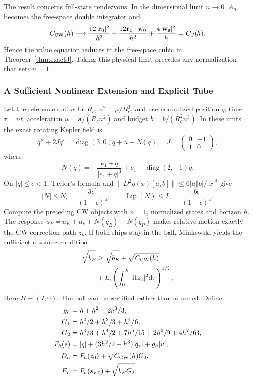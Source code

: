 \documentclass[journal,a4paper]{IEEEtran}
\newcommand{\dd}{\mathrm d}
\begin{document}
The result concerns full-state rendezvous. In the dimensional limit
$n\to0$, $A_n$ becomes the free-space double integrator and
\begin{equation}
 C_{\rm CW}(h)\longrightarrow
 \frac{12|\mathbf r_0|^2}{h^3}
 +\frac{12\mathbf r_0\cdot\mathbf w_0}{h^2}
 +\frac{4|\mathbf w_0|^2}{h}=C_J(h).
\end{equation}
Hence the value equation reduces to the free-space cubic in
Theorem~\ref{thm:exactJ}. Taking this physical limit precedes any
normalization that sets $n=1$.

\subsubsection{A Sufficient Nonlinear Extension and Explicit Tube}
Let the reference radius be $R_c$, $n^2=\mu/R_c^3$, and use normalized
position $q$, time $\tau=nt$, acceleration $u=\mathbf a/(R_cn^2)$ and
budget $\bar b=b/(R_c^2n^3)$. In these units the exact rotating Kepler
field is
\begin{equation}
 q''+2Jq'=\operatorname{diag}(3,0)q+u+N(q),
 \quad J=\begin{pmatrix}0&-1\\1&0\end{pmatrix},
\end{equation}
where
\begin{equation}
 N(q)=-\frac{e_1+q}{|e_1+q|^3}+e_1-\operatorname{diag}(2,-1)q.
\end{equation}
On $|q|\le\epsilon<1$, Taylor's formula and
$\|D^2g(x)[a,b]\|\le6|a||b|/|x|^4$ give
\begin{equation}
 |N|\le N_\epsilon=\frac{3\epsilon^2}{(1-\epsilon)^4},\qquad
 \operatorname{Lip}(N)\le L_\epsilon=\frac{6\epsilon}{(1-\epsilon)^4}.
\end{equation}
Compute the preceding CW objects with $n=1$, normalized states and horizon
$h$. The response $u_P=u_E+a_h+N(q_E)-N(q_P)$ makes relative motion
exactly the CW correction path $z_h$. If both ships stay in the ball,
Minkowski yields the sufficient resource condition
\begin{equation}
\begin{split}
 \sqrt{\bar b_P}&\ge\sqrt{\bar b_E}+\sqrt{C_{\rm CW}(h)}\\
 &+L_\epsilon\left(\int_0^h|\Pi z_h|^2\dd\tau\right)^{1/2},
\end{split}
\end{equation}
Here $\Pi=(I,0)$. The ball can be certified rather than assumed. Define
\begin{align}
 g_h&=h+h^2+2h^3/3,\nonumber\\
 G_1&=h^2/2+h^3/3+h^4/6,\nonumber\\
 G_2&=h^3/3+h^4/2+7h^5/15+2h^6/9+4h^7/63,\nonumber\\
 F_h(s)&=|q|+(3h^2/2+h^3)|q_x|+g_h|v|,\nonumber\\
 D_h&=F_h(z_0)+\sqrt{C_{\rm CW}(h)G_2},\nonumber\\
 E_h&=F_h(s_{E0})+\sqrt{\bar b_EG_2}.
\end{align}
\end{document}
